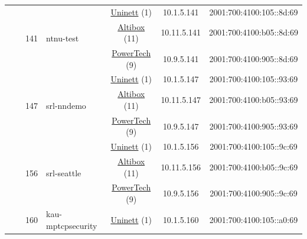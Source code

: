 \begin{small}
\begin{center}
\begin{longtable}{|c|c|c|c|c|c|c|c|}
  &  & \multirow{3}{*}{\tiny{141}} & \multicolumn{1}{|l|}{\multirow{3}{*}{\tiny{ntnu-test}}} & \multicolumn{2}{|c|}{\tiny{\href{https://www.uninett.no}{Uninett} (1)}} & \tiny{10.1.5.141} & \tiny{2001:700:4100:105::8d:69} \\* \cline{5-5}\cline{6-6}\cline{7-7}\cline{8-8}
  &  &  &  & \multicolumn{2}{|c|}{\tiny{\href{https://www.altibox.no}{Altibox} (11)}} & \tiny{10.11.5.141} & \tiny{2001:700:4100:b05::8d:69} \\* \cline{5-5}\cline{6-6}\cline{7-7}\cline{8-8}
  &  &  &  & \multicolumn{2}{|c|}{\tiny{\href{http://www.powertech.no}{PowerTech} (9)}} & \tiny{10.9.5.141} & \tiny{2001:700:4100:905::8d:69} \\* \cline{3-3}\cline{4-4}\cline{5-5}\cline{6-6}\cline{7-7}\cline{8-8}
  &  & \multirow{3}{*}{\tiny{147}} & \multicolumn{1}{|l|}{\multirow{3}{*}{\tiny{srl-nndemo}}} & \multicolumn{2}{|c|}{\tiny{\href{https://www.uninett.no}{Uninett} (1)}} & \tiny{10.1.5.147} & \tiny{2001:700:4100:105::93:69} \\* \cline{5-5}\cline{6-6}\cline{7-7}\cline{8-8}
  &  &  &  & \multicolumn{2}{|c|}{\tiny{\href{https://www.altibox.no}{Altibox} (11)}} & \tiny{10.11.5.147} & \tiny{2001:700:4100:b05::93:69} \\* \cline{5-5}\cline{6-6}\cline{7-7}\cline{8-8}
  &  &  &  & \multicolumn{2}{|c|}{\tiny{\href{http://www.powertech.no}{PowerTech} (9)}} & \tiny{10.9.5.147} & \tiny{2001:700:4100:905::93:69} \\* \cline{3-3}\cline{4-4}\cline{5-5}\cline{6-6}\cline{7-7}\cline{8-8}
  &  & \multirow{3}{*}{\tiny{156}} & \multicolumn{1}{|l|}{\multirow{3}{*}{\tiny{srl-seattle}}} & \multicolumn{2}{|c|}{\tiny{\href{https://www.uninett.no}{Uninett} (1)}} & \tiny{10.1.5.156} & \tiny{2001:700:4100:105::9c:69} \\* \cline{5-5}\cline{6-6}\cline{7-7}\cline{8-8}
  &  &  &  & \multicolumn{2}{|c|}{\tiny{\href{https://www.altibox.no}{Altibox} (11)}} & \tiny{10.11.5.156} & \tiny{2001:700:4100:b05::9c:69} \\* \cline{5-5}\cline{6-6}\cline{7-7}\cline{8-8}
  &  &  &  & \multicolumn{2}{|c|}{\tiny{\href{http://www.powertech.no}{PowerTech} (9)}} & \tiny{10.9.5.156} & \tiny{2001:700:4100:905::9c:69} \\* \cline{3-3}\cline{4-4}\cline{5-5}\cline{6-6}\cline{7-7}\cline{8-8}
  &  & \multirow{3}{*}{\tiny{160}} & \multicolumn{1}{|l|}{\multirow{3}{*}{\tiny{kau-mptcpsecurity}}} & \multicolumn{2}{|c|}{\tiny{\href{https://www.uninett.no}{Uninett} (1)}} & \tiny{10.1.5.160} & \tiny{2001:700:4100:105::a0:69} \\* \cline{5-5}\cline{6-6}\cline{7-7}\cline{8-8}

\end{longtable}
\end{center}
\end{small}
